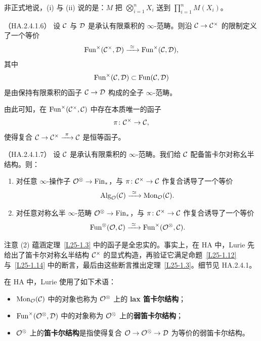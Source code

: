 \begin{remark}\label{L25-1.11}
非正式地说，(i) 与 (ii) 说的是：$M$ 把 $\bigotimes_{i=1}^{n}X_{i}$ 送到 $\prod_{i=1}^{n}M(X_{i})$。
\end{remark}

\begin{proposition}\label{L25-1.12}（HA.2.4.1.6）
设 $\mathcal{C}$ 与 $\mathcal{D}$ 是承认有限乘积的 $\infty$-范畴。则沿 $\mathcal{C}\to\mathcal{C}^{\times}$ 的限制定义了一个等价
\[
\Fun^{\times}(\cC^{\times},\cD)\xrightarrow{\ \simeq\ }\Fun^{\times}(\cC,\cD),
\]
其中
\[
\operatorname{Fun}^{\times}(\mathcal{C},\mathcal{D})\subset\operatorname{Fun}(\mathcal{C},\mathcal{D})
\]
是由保持有限乘积的函子 $\mathcal{C}\to\mathcal{D}$ 构成的全子 $\infty$-范畴。
\end{proposition}

\nitem\label{L25-1.13} 由此可知，在 $\operatorname{Fun}^{\times}(\mathcal{C}^{\times},\mathcal{C})$ 中存在本质唯一的函子
\[
\pi\colon\mathcal{C}^{\times}\to\mathcal{C},
\]
使得复合 $\cC\to\cC^{\times}\xrightarrow{\ \pi\ }\cC$ 是恒等函子。

\begin{proposition}\label{L25-1.14}（HA.2.4.1.7）
设 $\mathcal{C}$ 是承认有限乘积的 $\infty$-范畴。我们给 $\mathcal{C}$ 配备笛卡尔对称幺半结构。则：
\begin{enumerate}[label=(\arabic*),leftmargin=2.4em,itemsep=0.1em]
\item 对任意 $\infty$-操作子 $\mathcal{O}^{\otimes}\to\mathrm{Fin}_{*}$，与 $\pi\colon\mathcal{C}^{\times}\to\mathcal{C}$ 作复合诱导了一个等价
\[
\Alg_{\OO}(\cC)\xrightarrow{\ \simeq\ }\Mon_{\OO}(\cC).
\]
\item 对任意对称幺半 $\infty$-范畴 $\mathcal{O}^{\otimes}\to\mathrm{Fin}_{*}$，与 $\pi\colon\mathcal{C}^{\times}\to\mathcal{C}$ 作复合诱导了一个等价
\[
\Fun^{\otimes}(\OO,\cC)\xrightarrow{\ \simeq\ }\Fun^{\times}(\OO^{\otimes},\cC).
\]
\end{enumerate}
\end{proposition}

\begin{remark}\label{L25-1.15}
注意 (2) 蕴涵定理~\ref{L25-1.3} 中的函子是全忠实的。事实上，在 HA 中，Lurie 先给出了笛卡尔对称幺半结构 $\mathcal{C}^{\times}$ 的显式构造，再验证它满足命题~\ref{L25-1.12} 与~\ref{L25-1.14} 中的断言，最后由这些断言推出定理~\ref{L25-1.3}。细节见 HA.2.4.1。
\end{remark}

\begin{remark}\label{L25-1.16}
在 HA 中，Lurie 使用了如下术语：
\begin{itemize}[leftmargin=2.2em,itemsep=0.1em]
\item $\operatorname{Mon}_{\mathcal{O}}(\mathcal{C})$ 中的对象也称为 $\mathcal{O}^{\otimes}$ 上的 \textbf{lax 笛卡尔结构}；
\item $\operatorname{Fun}^{\times}(\mathcal{O}^{\otimes},\mathcal{D})$ 中的对象称为 $\mathcal{O}^{\otimes}$ 上的\textbf{弱笛卡尔结构}；
\item $\mathcal{O}^{\otimes}$ 上的\textbf{笛卡尔结构}是指使得复合 $\mathcal{O}\to\mathcal{O}^{\otimes}\to\mathcal{D}$ 为等价的弱笛卡尔结构。
\end{itemize}
\end{remark}


